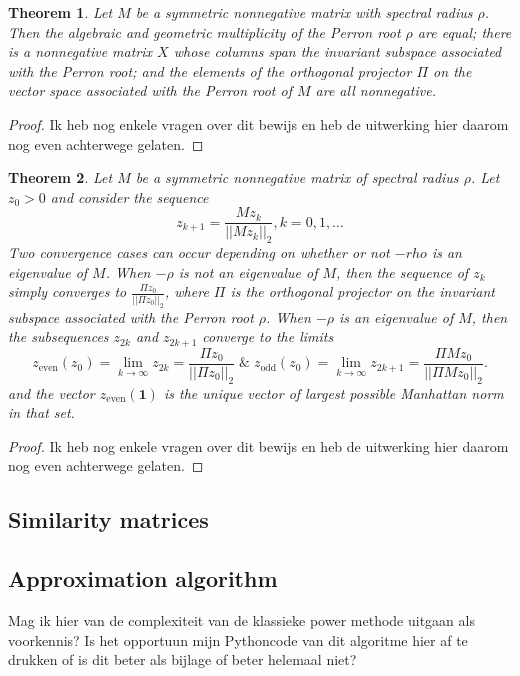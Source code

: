\documentclass[a4paper,11pt]{report}
\newtheorem{theorem}{Theorem}[section]
\begin{document}
\begin{theorem}
  Let $M$ be a symmetric nonnegative matrix with spectral radius $\rho$. Then 
  the algebraic and geometric multiplicity of the Perron root $\rho$ are equal; 
  there is a nonnegative matrix $X$ whose columns span the invariant subspace 
  associated with the Perron root; and the elements of the orthogonal projector 
  $\Pi$ on the vector space associated with the Perron root of $M$ are all 
  nonnegative.
\end{theorem}
\begin{proof}
  Ik heb nog enkele vragen over dit bewijs en heb de uitwerking hier daarom nog 
  even
  achterwege gelaten.
\end{proof}
 \begin{theorem}
   Let $M$ be a symmetric nonnegative matrix of spectral radius $\rho$. Let $z_0 > 0$ 
   and consider the sequence
   $$z_{k+1} = \frac{Mz_k}{||Mz_k||_2}, k = 0,1,\ldots$$
   Two convergence cases can occur depending on whether or not $-rho$ is an 
   eigenvalue of $M$. When $-\rho$ is not an eigenvalue of $M$, then the 
   sequence of $z_k$ simply converges to 
   $\frac{\Pi z_0}{||\Pi z_0||_2}$, where $\Pi$ is the orthogonal projector on the 
   invariant subspace associated with the Perron root $\rho$. When $-\rho$ is an 
   eigenvalue of $M$, then the subsequences $z_{2k}$ and $z_{2k+1}$ converge to 
   the limits
   $$z_{\text{even}}(z_0) = \lim_{k \to \infty} z_{2k}  = \frac{\Pi z_0}{||\Pi z_0||_2} \; \& \; z_{\text{odd}}(z_0) = \lim_{k \to \infty} z_{2k+1} = \frac{\Pi M z_0}{||\Pi M z_0||_2}.$$
and the vector $z_{\text{even}}(\mathbf{1})$ is the unique vector of largest 
possible Manhattan norm in that set. \end{theorem}

\begin{proof}
  Ik heb nog enkele vragen over dit bewijs en heb de uitwerking hier daarom nog 
  even
  achterwege gelaten.
\end{proof}

\subsection{Similarity matrices}


\subsection{Approximation algorithm}
Mag ik hier van de complexiteit van de klassieke power methode uitgaan als 
voorkennis? Is het opportuun mijn Pythoncode van dit algoritme hier af te 
drukken of is dit beter als bijlage of beter helemaal niet?
\end{document}
